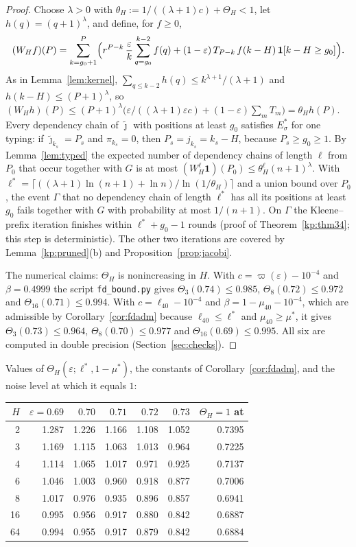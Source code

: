 \documentclass[11pt]{amsart}
\theoremstyle{definition}
\theoremstyle{remark}
\newcommand{\eps}{\varepsilon}
\newcommand{\jt}{\tilde{\jmath}}
\begin{document}
\begin{proof}
Choose $\lambda>0$ with $\theta_H:=1/((\lambda+1)c)+\Theta_H<1$, let $h(q)=(q+1)^\lambda$, and
define, for $f\ge0$,
\[
(W_Hf)(P)=\sum_{k=g_0+1}^{P}\Bigl(r^{P-k}\,\frac{\eps}{k}\sum_{q=g_0}^{k-2}f(q)
+(1-\eps)\,T_{P-k}\,f(k-H)\,\mathbf 1[k-H\ge g_0]\Bigr).
\]
As in Lemma~\ref{lem:kernel}, $\sum_{q\le k-2}h(q)\le k^{\lambda+1}/(\lambda+1)$ and
$h(k-H)\le(P+1)^\lambda$, so
$(W_Hh)(P)\le(P+1)^\lambda\bigl(\eps/((\lambda+1)\eps c)+(1-\eps)\sum_mT_m\bigr)=\theta_Hh(P)$.
Every dependency chain of $\jt$ with positions at least $g_0$ satisfies $E^*_\sigma$ for one
typing: if $\jt_{k_s}=P_s$ and $\pi_{k_s}=0$, then $P_s=j_{k_s}=k_s-H$, because $P_s\ge g_0\ge1$.
By Lemma~\ref{lem:typed} the expected number of dependency chains of length $\ell$ from $P_0$ that
occur together with $G$ is at most $(W_H^\ell\mathbf 1)(P_0)\le\theta_H^\ell(n+1)^\lambda$. With
$\ell^*=\lceil((\lambda+1)\ln(n+1)+\ln n)/\ln(1/\theta_H)\rceil$ and a union bound over $P_0$, the
event $\Gamma$ that no dependency chain of length $\ell^*$ has all its positions at least $g_0$
fails together with $G$ with probability at most $1/(n+1)$. On $\Gamma$ the Kleene--prefix
iteration finishes within $\ell^*+g_0-1$ rounds (proof of Theorem~\ref{kp:thm34}; this step is
deterministic). The other two iterations are covered by Lemma~\ref{kp:pruned}(b) and
Proposition~\ref{prop:jacobi}.

The numerical claims: $\Theta_H$ is nonincreasing in $H$. With $c=\varpi(\eps)-10^{-4}$
and $\beta=0.4999$ the script \texttt{fd\_bound.py} gives $\Theta_3(0.74)\le0.985$,
$\Theta_8(0.72)\le0.972$ and $\Theta_{16}(0.71)\le0.994$. With $c=\ell_{40}-10^{-4}$ and
$\beta=1-\mu_{40}-10^{-4}$, which are admissible by Corollary~\ref{cor:fdadm} because
$\ell_{40}\le\ell^*$ and $\mu_{40}\ge\mu^*$, it gives $\Theta_3(0.73)\le0.964$,
$\Theta_8(0.70)\le0.977$ and $\Theta_{16}(0.69)\le0.995$. All six are computed in double
precision (Section~\ref{sec:checks}).
\end{proof}

\noindent Values of $\Theta_H(\eps;\ell^*,1-\mu^*)$, the constants of
Corollary~\ref{cor:fdadm}, and the noise level at which it equals $1$:

\begin{center}
\begin{tabular}{rrrrrrr}
\toprule
$H$ & $\eps=0.69$ & $0.70$ & $0.71$ & $0.72$ & $0.73$ & $\Theta_H=1$ at\\
\midrule
2 & 1.287 & 1.226 & 1.166 & 1.108 & 1.052 & 0.7395\\
3 & 1.169 & 1.115 & 1.063 & 1.013 & 0.964 & 0.7225\\
4 & 1.114 & 1.065 & 1.017 & 0.971 & 0.925 & 0.7137\\
6 & 1.046 & 1.003 & 0.960 & 0.918 & 0.877 & 0.7006\\
8 & 1.017 & 0.976 & 0.935 & 0.896 & 0.857 & 0.6941\\
16 & 0.995 & 0.956 & 0.917 & 0.880 & 0.842 & 0.6887\\
64 & 0.994 & 0.955 & 0.917 & 0.879 & 0.842 & 0.6884\\
\bottomrule
\end{tabular}
\end{center}
\end{document}
